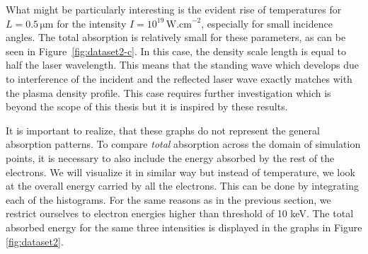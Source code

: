 What might be particularly interesting is the evident rise of temperatures for $L=0.5 \,\mathrm{\mu m}$ for the intensity $I = 10^{19}\, \mathrm{W.cm}^{-2}$, especially for small incidence angles. The total absorption is relatively small for these parameters, as can be seen in Figure~\ref{fig:dataset2-c}. In this case, the density scale length is equal to half the laser wavelength. This means that the standing wave which develops due to interference of the incident and the reflected laser wave exactly matches with the plasma density profile. This case requires further investigation which is beyond the scope of this thesis but it is inspired by these results.

It is important to realize, that these graphs do not represent the general absorption patterns. To compare \textit{total} absorption across the domain of simulation points, it is necessary to also include the energy absorbed by the rest of the electrons. We will visualize it in similar way but instead of temperature, we look at the overall energy carried by all the electrons. This can be done by integrating each of the histograms. For the same reasons as in the previous section, we restrict ourselves to electron energies higher than threshold of 10 keV. The total absorbed energy for the same three intensities is displayed in the graphs in Figure \ref{fig:dataset2}.

